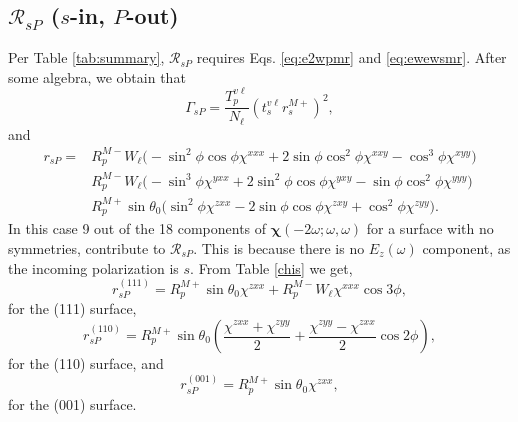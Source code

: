
\subsection{\texorpdfstring{$\mathcal{R}_{sP}$ ($s$-in, $P$-out)}
{RsP (s-in, P-out)}}
\label{sec:RsP}

Per Table \ref{tab:summary}, $\mathcal{R}_{sP}$ requires Eqs. \eqref{eq:e2wpmr}
and \eqref{eq:ewewsmr}. After some algebra, we obtain that
\begin{equation}\label{mcv4}
\Gamma_{sP}=
\frac{T^{v\ell}_{p}}{N_{\ell}}
\left(t^{v\ell}_{s}r^{M+}_{s}\right)^{2},
\end{equation}
and
\begin{equation}
\begin{split}
r_{sP} = 
& R^{M-}_{p}W_{\ell}
\big(
- \sin^{2}\phi\cos\phi\chi^{xxx}
+ 2\sin\phi\cos^{2}\phi\chi^{xxy}
- \cos^{3}\phi\chi^{xyy}
\big)\\
& R^{M-}_{p}W_{\ell}
\big(
- \sin^{3}\phi\chi^{yxx}
+ 2\sin^{2}\phi\cos\phi\chi^{yxy}
- \sin\phi\cos^{2}\phi\chi^{yyy}
\big)\\
& R^{M+}_{p}\sin\theta_{0}
\big(
  \sin^{2}\phi\chi^{zxx}
- 2\sin\phi\cos\phi\chi^{zxy}
+ \cos^{2}\phi\chi^{zyy}
\big).
\end{split}
\end{equation}
In this case 9 out of the 18 components of
$\boldsymbol{\chi}(-2\omega;\omega,\omega)$ for a surface with no symmetries,
contribute to $\mathcal{R}_{sP}$. This is because there is no $E_{z}(\omega)$
component, as the incoming polarization is $s$. From Table
\ref{chis} we get,
\begin{equation}\label{eq:rsp111}
r^{(111)}_{sP} = 
R^{M+}_{p}\sin\theta_{0}\chi^{zxx} +
R^{M-}_{p}W_{\ell}\chi^{xxx}\cos3\phi,
\end{equation}
for the (111) surface,
\begin{equation}\label{eq:rsp110}
r^{(110)}_{sP} = 
R^{M+}_{p}\sin\theta_{0}
\left(
\frac{\chi^{zxx} + \chi^{zyy}}{2} + \frac{\chi^{zyy} - \chi^{zxx}}{2}\cos2\phi
\right),
\end{equation}
for the (110) surface, and
\begin{equation}\label{eq:rsp001}
r^{(001)}_{sP} = R^{M+}_{p}\sin\theta_{0}\chi^{zxx},
\end{equation}
for the (001) surface.



